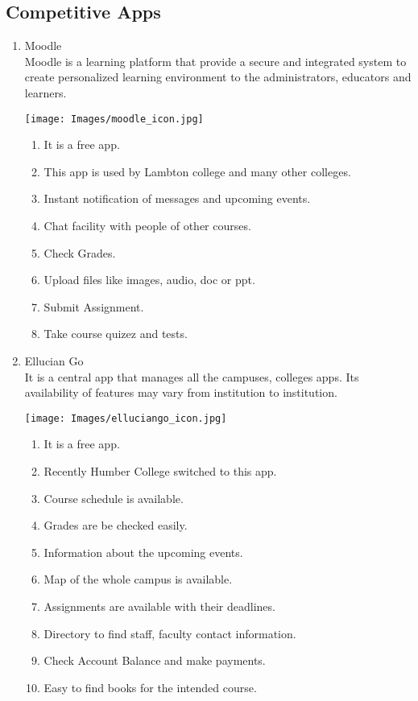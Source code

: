 \subsection{Competitive Apps}
\begin{enumerate}
    \item Moodle
    \\Moodle is a learning platform that provide a secure and integrated system to create personalized learning environment to the administrators, educators and learners.
   
   \begin{center}
       \texttt{[image: Images/moodle\_icon.jpg]}
   \end{center}
   
   \begin{enumerate}
       \item It is a free app.
       \item This app is used by Lambton college and many other colleges.
       \item Instant notification of messages and upcoming events.
       \item Chat facility with people of other courses.
       \item Check Grades.
       \item Upload files like images, audio, doc or ppt.
       \item Submit Assignment.
       \item Take course quizez and tests.
   \end{enumerate}
   
   \item Ellucian Go
   \\ It is a central app that manages all the campuses, colleges apps. Its availability of features may vary from institution to institution.
   \begin{center}
       \texttt{[image: Images/elluciango\_icon.jpg]}
   \end{center}
   \begin{enumerate}
       \item It is a free app.
       \item Recently Humber College switched to this app.
       \item Course schedule is available.
       \item Grades are be checked easily.
       \item Information about the upcoming events.
       \item Map of the whole campus is available.
       \item Assignments are available with their deadlines.
       \item Directory to find staff, faculty contact information.
       \item Check Account Balance and make payments.
       \item Easy to find books for the intended course.
   \end{enumerate}
   

\end{enumerate}
